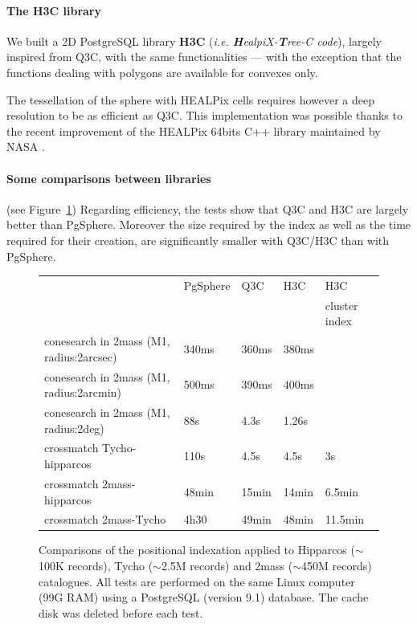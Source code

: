 \paragraph{The H3C library}

We built a 2D PostgreSQL library \textbf{H3C} 
(\textit{i.e. \textbf{H}ealpiX-\textbf{T}ree-C code}), largely inspired from
 Q3C, with the same functionalities --- with the exception that
the functions dealing with polygons are available 
for convexes only.

The tessellation of the sphere with HEALPix cells requires however
a deep resolution 
to be as efficient as Q3C. This implementation was possible thanks to the recent
improvement of the  HEALPix 64bits C++ library maintained by NASA 
\citep{gorski_healpix}.

\paragraph{Some comparisons between libraries} (see Figure~\ref{P044:comparative})
Regarding  efficiency, the tests show that Q3C and H3C are largely better than 
PgSphere. Moreover the size required by the index
as well as the time required for their creation,
are significantly smaller with Q3C/H3C than with PgSphere.

\begin{figure}[htp] \center
\begin{small}
\begin{tabular}{lllll}
 & PgSphere & Q3C & H3C & H3C  \\
 &          &     &     &{\scriptsize cluster index} \\
conesearch in 2mass (M1, radius:2arcsec) & 340ms& 360ms& 380ms &\\
conesearch in 2mass (M1, radius:2arcmin) & 500ms& 390ms& 400ms &\\
conesearch in 2mass (M1, radius:2deg)    & 88s& 4.3s& 1.26s &\\
crossmatch Tycho-hipparcos & 110s & 4.5s &  4.5s & 3s\\ 
crossmatch 2mass-hipparcos & 48min & 15min & 14min & 6.5min\\ 
crossmatch 2mass-Tycho     & 4h30 & 49min  & 48min & 11.5min\\ 
\end{tabular}
\end{small}
\caption{Comparisons of the positional indexation applied to Hipparcos 
($\sim$100K records), Tycho ($\sim$2.5M records) and 2mass ($\sim$450M records)
catalogues. All tests are performed on the same Linux computer (99G RAM) using a
PostgreSQL (version 9.1) database. The cache disk was deleted before each test.}
\label{P044:comparative}
\end{figure}

